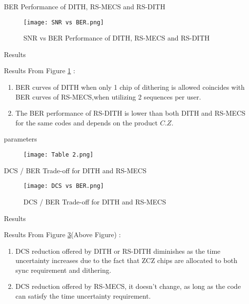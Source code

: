 \documentclass{beamer}
\begin{document}
\begin{frame}{BER Performance of DITH, RS-MECS and RS-DITH}
\begin{figure}
    \centering
    \texttt{[image: SNR vs BER.png]}
    \caption{SNR vs BER Performance of DITH, RS-MECS and RS-DITH}
    \label{fig:SNR vs BER perfomance for all schemes}
\end{figure}
\end{frame}

\begin{frame}{ Results}
\begin{block}{Results}
From Figure \ref{fig:SNR vs BER perfomance for all schemes} :
\begin{enumerate}
    \item BER curves of DITH when only 1 chip of dithering is allowed coincides with BER curves of RS-MECS,when utilizing 2 sequences per user.
    \item The BER performance of RS-DITH is lower than both DITH and RS-MECS for the same codes and depends on the product $C.Z$.
\end{enumerate}
\end{block}
\end{frame}


\begin{frame}{parameters}
\begin{figure}
    \centering
    \texttt{[image: Table 2.png]}
    \label{fig:Table}
\end{figure}
\end{frame}

\begin{frame}{DCS / BER Trade-off for DITH and RS-MECS}
\begin{figure}
    \centering
    \texttt{[image: DCS vs BER.png]}
    \caption{DCS / BER Trade-off for DITH and RS-MECS}
    \label{fig:DCS/BER trade-off}
\end{figure}
\end{frame}

\begin{frame}{Results}
\begin{block}{Results}
From  Figure \ref{fig:DCS/BER trade-off}(Above Figure) :
\begin{enumerate}
    \item DCS reduction offered by DITH or RS-DITH diminishes as the time uncertainty increases due to the fact that ZCZ chips are allocated to both sync requirement and dithering.
    \item DCS reduction offered by RS-MECS, it doesn’t change, as long as the code can satisfy the time uncertainty requirement.
\end{enumerate}
\end{block}
\end{frame}
\end{document}
